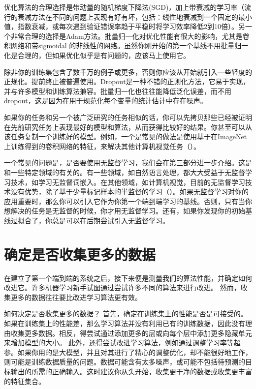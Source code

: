 优化算法的合理选择是带动量的随机梯度下降法(SGD)，加上带衰减的学习率（流行的衰减方法在不同的问题上表现有好有坏，包括：线性地衰减到一个固定的最小值，指数衰减，或每次遇到验证错误率趋于平稳时将学习效率降低2到10倍）。另一个非常合理的选择是Adam方法。批量归一化对优化性能有很大的影响，尤其是卷积网络和带sigmoidal 的非线性的网络。虽然你刚开始的第一个基线不用批量归一化是合理的，但如果优化似乎是有问题的，应该马上使用它。

除非你的训练集包含了数千万的例子或更多，否则你应该从开始就引入一些轻度的正规化。提前终止被普遍使用。Dropout是一种不错的正则化方法，它易于实现，并与许多模型和训练算法兼容。批量归一化也往往能降低泛化误差，而不用dropout，这是因为在用于规范化每个变量的统计估计中存在噪声。 

如果你的任务和另一个被广泛研究的任务相似的话，你可以先拷贝那些已经被证明在先前研究任务上表现最好的模型和算法，从而获得比较好的结果。你甚至可以从该任务复制一个训练好的模型。例如，一个是常见的做法是使用基于在ImageNet上训练得到的卷积网络的特征，来解决其他计算机视觉任务（\citep{girshickregion}）。

一个常见的问题是，是否要使用无监督学习，我们会在第三部分进一步介绍。这是和一些特定领域的有关的。有一些领域，如自然语言处理，都大大受益于无监督学习技术，如学习无监督词嵌入。在其他领域，如计算机视觉，目前的无监督学习技术没有优势，除了基于少量标记样本的半监督的学习（\citep{Kingma-et-al-NIPS2014,Rasmus-et-al-arxiv2015}）。如果无监督学习对你的应用重要时，那么你可以引入它作为你第一个端到端学习的基线。否则，只有当你想解决的任务是无监督的时候，你才用无监督学习。还有，如果你发现你的初始基线过拟合了，你总是可以在后期尝试引入无监督学习。


\section{确定是否收集更多的数据}
\label{sec:11.3}

在建立了第一个端到端的系统之后，接下来便是测量我们的算法性能，并确定如何改进它。许多机器学习新手试图通过尝试许多不同的算法来进行改进。 然而，收集更多的数据往往要比改进学习算法更有效。

如何决定是否收集更多的数据？ 首先，确定在训练集上的性能是否是可接受的。如果在训练集上的性能差，那么学习算法并没有利用已有的训练数据，因此没有理由收集更多数据。相反，得尝试通过添加更多的层或向每个层中添加更多隐藏单元来增加模型的大小。 此外，还得尝试改进学习算法，例如通过调整学习率等超参。如果你用的是大模型，并且对其进行了精心的调整优化，却不能很好地工作，则可能是训练数据质量的问题。数据可能含有太多噪声，或可能不包括待预测的目标输出的所需的正确输入。这时建议你从头开始，收集更干净的数据或收集更丰富的特征集合。

